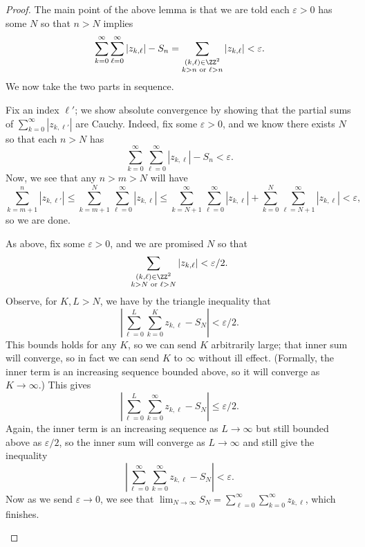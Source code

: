 \begin{proof}
	The main point of the above lemma is that we are told each $\varepsilon>0$ has some $N$ so that $n>N$ implies
	\[\sum_{k=0}^\infty\sum_{\ell=0}^\infty|z_{k,\ell}|-S_n=\sum_{\substack{(k,\ell)\in\ZZ^2\\k>n\text{ or }\ell>n}}|z_{k,\ell}|<\varepsilon.\]
	We now take the two parts in sequence.
	\begin{listalph}
		\item Fix an index $\ell'$; we show absolute convergence by showing that the partial sums of $\sum_{k=0}^\infty|z_{k,\ell'}|$ are Cauchy. Indeed, fix some $\varepsilon>0$, and we know there exists $N$ so that each $n>N$ has
		\[\sum_{k=0}^\infty\sum_{\ell=0}^\infty|z_{k,\ell}|-S_n<\varepsilon.\]
		Now, we see that any $n>m>N$ will have
		\[\sum_{k=m+1}^n|z_{k,\ell'}|\le\sum_{k=m+1}^N\sum_{\ell=0}^\infty|z_{k,\ell}|\le\sum_{k=N+1}^\infty\sum_{\ell=0}^\infty|z_{k,\ell}|+\sum_{k=0}^N\sum_{\ell=N+1}^\infty|z_{k,\ell}|<\varepsilon,\]
		so we are done.
		\item As above, fix some $\varepsilon>0$, and we are promised $N$ so that
		\[\sum_{\substack{(k,\ell)\in\ZZ^2\\k>N\text{ or }\ell>N}}|z_{k,\ell}|<\varepsilon/2.\]
		Observe, for $K,L>N$, we have by the triangle inequality that
		\[\left|\sum_{\ell=0}^L\sum_{k=0}^Kz_{k,\ell}-S_N\right|<\varepsilon/2.\]
		This bounds holds for any $K$, so we can send $K$ arbitrarily large; that inner sum will converge, so in fact we can send $K$ to $\infty$ without ill effect. (Formally, the inner term is an increasing sequence bounded above, so it will converge as $K\to\infty$.) This gives
		\[\left|\sum_{\ell=0}^L\sum_{k=0}^\infty z_{k,\ell}-S_N\right|\le\varepsilon/2.\]
		Again, the inner term is an increasing sequence as $L\to\infty$ but still bounded above as $\varepsilon/2$, so the inner sum will converge as $L\to\infty$ and still give the inequality
		\[\left|\sum_{\ell=0}^\infty\sum_{k=0}^\infty z_{k,\ell}-S_N\right|<\varepsilon.\]
		Now as we send $\varepsilon\to0$, we see that $\lim_{N\to\infty}S_N=\sum_{\ell=0}^\infty\sum_{k=0}^\infty z_{k,\ell}$, which finishes.\qedhere
	\end{listalph}
\end{proof}

